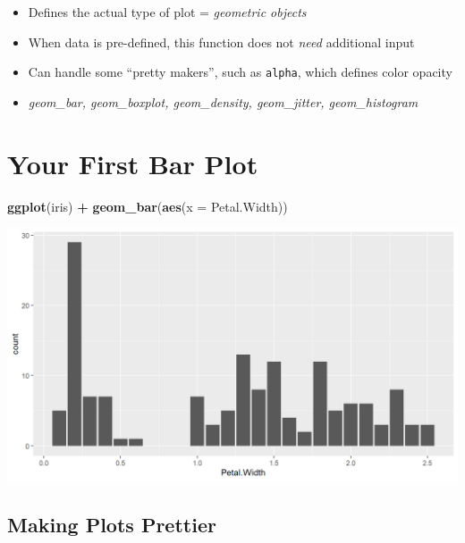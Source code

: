 \documentclass[
]{book}
\newenvironment{Shaded}{\begin{snugshade}}{\end{snugshade}}
\newcommand{\AttributeTok}[1]{\textcolor[rgb]{0.13,0.29,0.53}{#1}}
\newcommand{\FunctionTok}[1]{\textcolor[rgb]{0.13,0.29,0.53}{\textbf{#1}}}
\newcommand{\NormalTok}[1]{#1}
\newcommand{\SpecialCharTok}[1]{\textcolor[rgb]{0.81,0.36,0.00}{\textbf{#1}}}
\providecommand{\tightlist}{%
  \setlength{\itemsep}{0pt}\setlength{\parskip}{0pt}}
\begin{document}
\begin{itemize}
\tightlist
\item
  Defines the actual type of plot = \emph{geometric objects}
\item
  When data is pre-defined, this function does not \emph{need} additional input
\item
  Can handle some ``pretty makers'', such as \texttt{alpha}, which defines color opacity
\item
  \emph{geom\_bar, geom\_boxplot, geom\_density, geom\_jitter, geom\_histogram}
\end{itemize}

\section{Your First Bar Plot}\label{your-first-bar-plot}

\begin{Shaded}
\begin{Highlighting}[]
\FunctionTok{ggplot}\NormalTok{(iris) }\SpecialCharTok{+} 
  \FunctionTok{geom\_bar}\NormalTok{(}\FunctionTok{aes}\NormalTok{(}\AttributeTok{x =}\NormalTok{ Petal.Width)) }
\end{Highlighting}
\end{Shaded}

\begin{flushleft}\includegraphics{_main_files/figure-html/unnamed-chunk-31-1} \end{flushleft}

\subsection{Making Plots Prettier}\label{making-plots-prettier}
\end{document}

